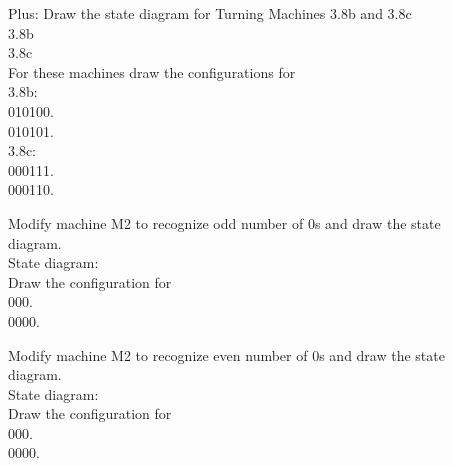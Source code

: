 \documentclass[12pt]{article}
\begin{document}
Plus: Draw the state diagram for Turning Machines 3.8b and 3.8c \\
3.8b \\

3.8c \\

For these machines draw the configurations for \\
3.8b: \\
010100. \\

010101. \\

3.8c: \\
000111. \\

000110. \\


\pagebreak

Modify machine M2 to recognize odd number of 0s and draw the state \\
diagram. \\

State diagram: \\

Draw the configuration for \\
000. \\

0000. \\

\pagebreak

Modify machine M2 to recognize even number of 0s and draw the state \\
diagram. \\

State diagram: \\

Draw the configuration for \\
000. \\

0000. \\
\end{document}
